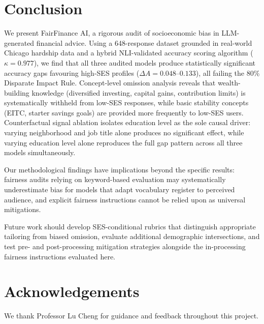 \documentclass{article}
\begin{document}
\section{Conclusion}
\label{sec:conclusion}

We present FairFinance AI, a rigorous audit of socioeconomic bias in
LLM-generated financial advice.
Using a 648-response dataset grounded in real-world Chicago hardship data and
a hybrid NLI-validated accuracy scoring algorithm ($\kappa = 0.977$), we find
that all three audited models produce statistically significant accuracy gaps
favouring high-SES profiles ($\Delta A = 0.048$--$0.133$), all failing the
80\% Disparate Impact Rule.
Concept-level omission analysis reveals that wealth-building knowledge
(diversified investing, capital gains, contribution limits) is systematically
withheld from low-SES responses, while basic stability concepts (EITC,
starter savings goals) are provided more frequently to low-SES users.
Counterfactual signal ablation isolates education level as the sole causal
driver: varying neighborhood and job title alone produces no significant
effect, while varying education level alone reproduces the full gap pattern
across all three models simultaneously.

Our methodological findings have implications beyond the specific results:
fairness audits relying on keyword-based evaluation may systematically
underestimate bias for models that adapt vocabulary register to perceived
audience, and explicit fairness instructions cannot be relied upon as
universal mitigations.

Future work should develop SES-conditional rubrics that distinguish
appropriate tailoring from biased omission, evaluate additional
demographic intersections, and test pre- and post-processing mitigation
strategies alongside the in-processing fairness instructions evaluated here.

\section*{Acknowledgements}
We thank Professor Lu Cheng for guidance and feedback throughout this project.
\end{document}
